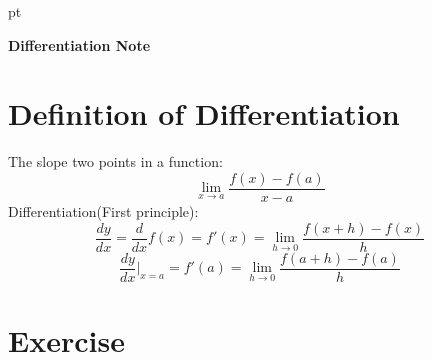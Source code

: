 \documentclass[12pt]{article}
\begin{document}
 pt
\begin{center}
	{\large \bf Differentiation Note}\\
	\vspace{2 mm}
\end{center}
\vspace{0.05cm}
\section{Definition of Differentiation}
The slope two points in a function:
$$\displaystyle\lim_{x \to a} \frac{f(x) - f(a)}{x-a} $$
Differentiation(First principle):
$$\displaystyle\frac{dy}{dx} = \frac{d}{dx}f(x)= f'(x)=\lim_{h \to 0}  \frac{f(x+h) - f(x)}{h} $$
$$\displaystyle\frac{dy}{dx}\Bigr\rvert_{x = a} = f'(a)=\lim_{h \to 0}  \frac{f(a+h) - f(a)}{h} $$
\newpage
\section{Exercise}
\end{document}
